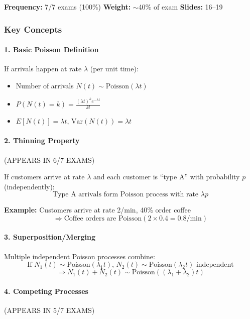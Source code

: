 \documentclass[11pt,letterpaper]{article}
\begin{document}
\textbf{Frequency:} 7/7 exams (100\%) \quad \textbf{Weight:} $\sim$40\% of exam \quad \textbf{Slides:} 16--19

\subsubsection{Key Concepts}

\paragraph{1. Basic Poisson Definition}
If arrivals happen at rate $\lambda$ (per unit time):
\begin{itemize}
  \item Number of arrivals $N(t) \sim \text{Poisson}(\lambda t)$
  \item $P(N(t) = k) = \frac{(\lambda t)^k e^{-\lambda t}}{k!}$
  \item $E[N(t)] = \lambda t$, \quad $\text{Var}(N(t)) = \lambda t$
\end{itemize}

\paragraph{2. Thinning Property} \textcolor{criticalcolor}{(APPEARS IN 6/7 EXAMS)}

\begin{tcolorbox}[colback=yellow!10,colframe=orange!80,title=Thinning - Most Important Concept]
If customers arrive at rate $\lambda$ and each customer is ``type A'' with probability $p$ (independently):
\[
\text{Type A arrivals form Poisson process with rate } \lambda p
\]

\textbf{Example:} Customers arrive at rate 2/min, 40\% order coffee
\[
\Rightarrow \text{Coffee orders are Poisson}(2 \times 0.4 = 0.8\text{/min})
\]
\end{tcolorbox}

\paragraph{3. Superposition/Merging}
Multiple independent Poisson processes combine:
\[
\text{If } N_1(t) \sim \text{Poisson}(\lambda_1 t), \, N_2(t) \sim \text{Poisson}(\lambda_2 t) \text{ independent}
\]
\[
\Rightarrow N_1(t) + N_2(t) \sim \text{Poisson}((\lambda_1 + \lambda_2)t)
\]

\paragraph{4. Competing Processes} \textcolor{highcolor}{(APPEARS IN 5/7 EXAMS)}
\end{document}
